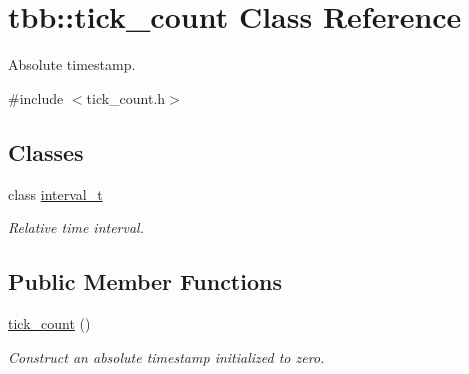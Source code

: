 \hypertarget{classtbb_1_1tick__count}{}\section{tbb\+:\+:tick\+\_\+count Class Reference}
\label{classtbb_1_1tick__count}


Absolute timestamp.  




{\ttfamily \#include $<$tick\+\_\+count.\+h$>$}

\subsection*{Classes}
\begin{DoxyCompactItemize}
\item 
class \hyperlink{classtbb_1_1tick__count_1_1interval__t}{interval\+\_\+t}
\begin{DoxyCompactList}\small\item\em Relative time interval. \end{DoxyCompactList}\end{DoxyCompactItemize}
\subsection*{Public Member Functions}
\begin{DoxyCompactItemize}
\item 
\hypertarget{classtbb_1_1tick__count_a9f1daa0b7a4feb800f802b4be1f1e497}{}\hyperlink{classtbb_1_1tick__count_a9f1daa0b7a4feb800f802b4be1f1e497}{tick\+\_\+count} ()\label{classtbb_1_1tick__count_a9f1daa0b7a4feb800f802b4be1f1e497}

\begin{DoxyCompactList}\small\item\em Construct an absolute timestamp initialized to zero. \end{DoxyCompactList}\end{DoxyCompactItemize}
